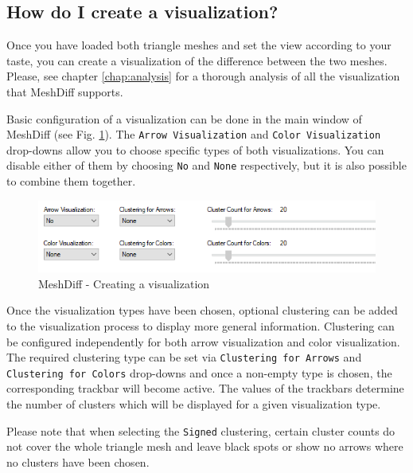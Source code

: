 \subsection{How do I create a visualization?}
\label{attch:user_doc-create_vis}

Once you have loaded both triangle meshes and set the view according to your taste, you can create a visualization of the difference between the two meshes. Please, see chapter \ref{chap:analysis} for a thorough analysis of all the visualization that MeshDiff supports.

Basic configuration of a visualization can be done in the main window of MeshDiff (see Fig. \ref{fig:meshdiff-creating_visualization}). The \verb+Arrow Visualization+ and \verb+Color Visualization+ drop-downs allow you to choose specific types of both visualizations. You can disable either of them by choosing \verb+No+ and \verb+None+ respectively, but it is also possible to combine them together.

\begin{figure}[h]
	\centering
	\includegraphics[width=\textwidth]{./img/meshdiff-vis_settings.PNG}
	\caption[MeshDiff - Creating a visualization]{MeshDiff - Creating a visualization}
	\label{fig:meshdiff-creating_visualization}
\end{figure}

Once the visualization types have been chosen, optional clustering can be added to the visualization process to display more general information. Clustering can be configured independently for both arrow visualization and color visualization. The required clustering type can be set via \verb+Clustering for Arrows+ and \verb+Clustering for Colors+ drop-downs and once a non-empty type is chosen, the corresponding trackbar will become active. The values of the trackbars determine the number of clusters which will be displayed for a given visualization type.

Please note that when selecting the \verb+Signed+ clustering, certain cluster counts do not cover the whole triangle mesh and leave black spots or show no arrows where no clusters have been chosen.

